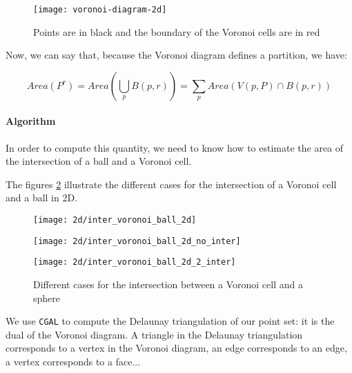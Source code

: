 \begin{figure}[h]
    \centering
    \texttt{[image: voronoi-diagram-2d]}
    \caption{Points are in black and the boundary of the Voronoi cells are in
        red}
    \label{fig:voronoi-diagram-2d}
\end{figure}

Now, we can say that, because the Voronoi diagram defines a partition, we have:

\begin{equation}
    Area(P^r) = Area \left( \bigcup_p B(p, r) \right) = \sum_p Area(V(p, P) \cap B(p, r))
    \label{eqn:area-union-balls}
\end{equation}

\paragraph{Algorithm}

In order to compute this quantity, we need to know how to estimate the area of the
intersection of a ball and a Voronoi cell.

The figures \ref{fig:inter_voronoi_ball_2d} illustrate the different cases for
the intersection of a Voronoi cell and a ball in 2D.

\begin{figure}[h]
    \centering
    \begin{minipage}{0.32\linewidth}
        \centering
        \texttt{[image: 2d/inter\_voronoi\_ball\_2d]}
        \label{fig:inter_voronoi_ball_2d:a}
    \end{minipage}
    \begin{minipage}{0.32\linewidth}
        \centering
        \texttt{[image: 2d/inter\_voronoi\_ball\_2d\_no\_inter]}
        \label{fig:inter_voronoi_ball_2d:b}
    \end{minipage}
    \begin{minipage}{0.32\linewidth}
        \centering
        \texttt{[image: 2d/inter\_voronoi\_ball\_2d\_2\_inter]}
        \label{fig:inter_voronoi_ball_2d:c}
    \end{minipage}

   \caption{Different cases for the intersection between a Voronoi cell and a sphere}
   \label{fig:inter_voronoi_ball_2d}
\end{figure}

We use \texttt{CGAL} to compute the Delaunay triangulation of our point set: it
is the dual of the Voronoi diagram. A triangle in the Delaunay
triangulation corresponds to a vertex in the Voronoi diagram, an edge
corresponds to an edge, a vertex corresponds to a face...


